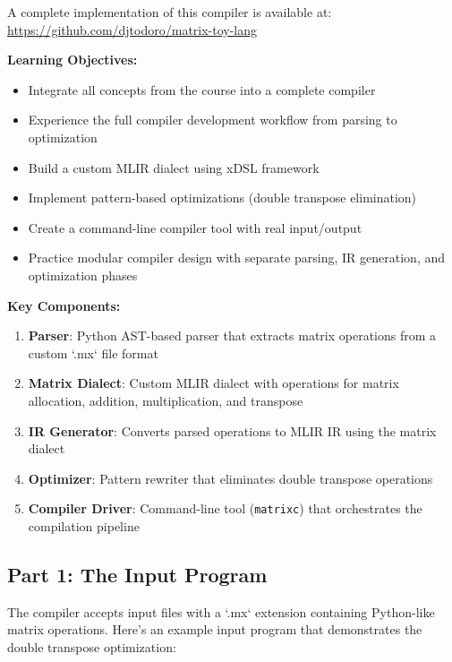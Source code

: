 \documentclass[11pt,a4paper]{article}
\begin{document}
A complete implementation of this compiler is available at: \url{https://github.com/djtodoro/matrix-toy-lang}

\textbf{Learning Objectives:}
\begin{itemize}
    \item Integrate all concepts from the course into a complete compiler
    \item Experience the full compiler development workflow from parsing to optimization
    \item Build a custom MLIR dialect using xDSL framework
    \item Implement pattern-based optimizations (double transpose elimination)
    \item Create a command-line compiler tool with real input/output
    \item Practice modular compiler design with separate parsing, IR generation, and optimization phases
\end{itemize}

\textbf{Key Components:}
\begin{enumerate}
    \item \textbf{Parser}: Python AST-based parser that extracts matrix operations from a custom `.mx` file format
    \item \textbf{Matrix Dialect}: Custom MLIR dialect with operations for matrix allocation, addition, multiplication, and transpose
    \item \textbf{IR Generator}: Converts parsed operations to MLIR IR using the matrix dialect
    \item \textbf{Optimizer}: Pattern rewriter that eliminates double transpose operations
    \item \textbf{Compiler Driver}: Command-line tool (\texttt{matrixc}) that orchestrates the compilation pipeline
\end{enumerate}

\subsection{Part 1: The Input Program}

The compiler accepts input files with a `.mx` extension containing Python-like matrix operations. Here's an example input program that demonstrates the double transpose optimization:
\end{document}
